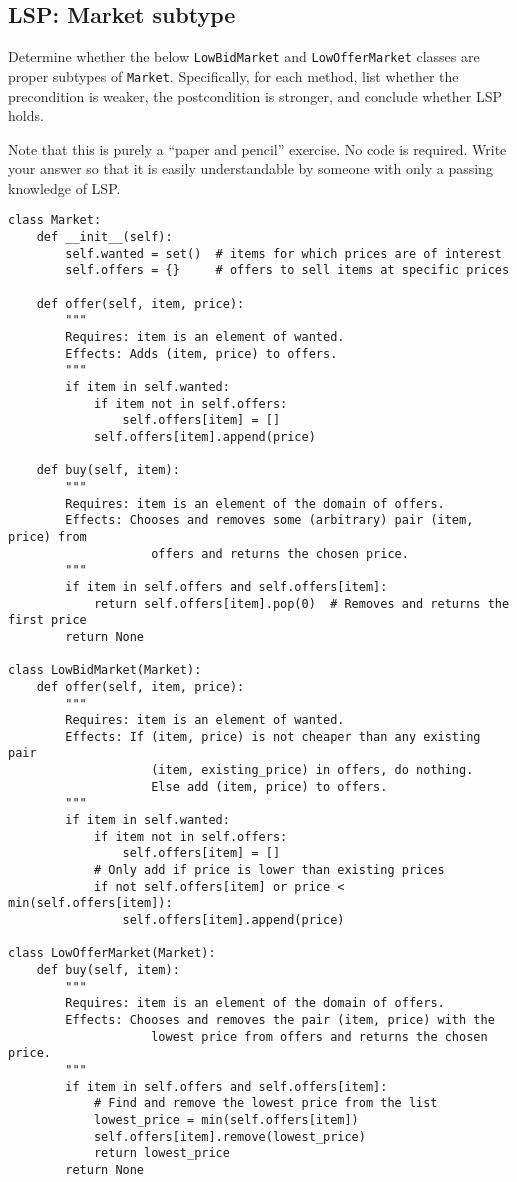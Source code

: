\documentclass[oneside,11pt,dvipsnames]{book}
\newcommand{\code}[1]{\texttt{#1}}
\begin{document}
\subsection{LSP: Market subtype}\label{exercise:market}

Determine whether the below \code{LowBidMarket} and \code{LowOfferMarket} classes are proper subtypes of \code{Market}. Specifically, for each method, list whether the precondition is weaker, the postcondition is stronger, and conclude whether LSP holds.

Note that this is purely a ``paper and pencil'' exercise. No code is required. Write your answer so that it is easily understandable by someone with only a passing knowledge of LSP.


\begin{lstlisting}
class Market:
    def __init__(self):
        self.wanted = set()  # items for which prices are of interest
        self.offers = {}     # offers to sell items at specific prices

    def offer(self, item, price):
        """
        Requires: item is an element of wanted.
        Effects: Adds (item, price) to offers.
        """
        if item in self.wanted:
            if item not in self.offers:
                self.offers[item] = []
            self.offers[item].append(price)

    def buy(self, item):
        """
        Requires: item is an element of the domain of offers.
        Effects: Chooses and removes some (arbitrary) pair (item, price) from
                    offers and returns the chosen price.
        """
        if item in self.offers and self.offers[item]:
            return self.offers[item].pop(0)  # Removes and returns the first price
        return None

class LowBidMarket(Market):
    def offer(self, item, price):
        """
        Requires: item is an element of wanted.
        Effects: If (item, price) is not cheaper than any existing pair
                    (item, existing_price) in offers, do nothing.
                    Else add (item, price) to offers.
        """
        if item in self.wanted:
            if item not in self.offers:
                self.offers[item] = []
            # Only add if price is lower than existing prices
            if not self.offers[item] or price < min(self.offers[item]):
                self.offers[item].append(price)

class LowOfferMarket(Market):
    def buy(self, item):
        """
        Requires: item is an element of the domain of offers.
        Effects: Chooses and removes the pair (item, price) with the 
                    lowest price from offers and returns the chosen price.
        """
        if item in self.offers and self.offers[item]:
            # Find and remove the lowest price from the list
            lowest_price = min(self.offers[item])
            self.offers[item].remove(lowest_price)
            return lowest_price
        return None                
\end{lstlisting}
\end{document}
